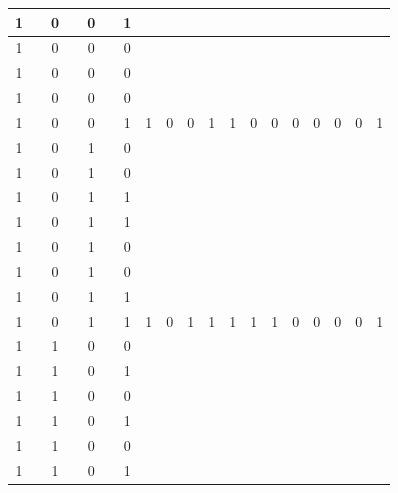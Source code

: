 \begin{table}[!tb]
\begin{tabular}{|c|c|c|c|c|c|c|c|c|c|c|c|c|c|c|c|c|c|c|}
        \rowcolor{yellow!40} 1 &  & 0 &  & 0 &  & 1 &  &  &  &  &  &  &  &  &  &  &  &  \\ \hline
        \rowcolor{yellow!40} 1 &  & 0 &  & 0 &  & 0 &  &  &  &  &  &  &  &  &  &  &  &  \\ \hline
        \rowcolor{yellow!40} 1 &  & 0 &  & 0 &  & 0 &  &  &  &  &  &  &  &  &  &  &  &  \\ \hline
        \rowcolor{yellow!40} 1 &  & 0 &  & 0 &  & 0 &  &  &  &  &  &  &  &  &  &  &  &  \\ \hline
        \rowcolor{yellow!40} 1 &  & 0 &  & 0 &  & 1 & 1 & 0 & 0 & 1 & 1 & 0 & 0 & 0 & 0 & 0 & 0 & 1 \\ \hline
        \rowcolor{gray!40} 1 &  & 0 &  & 1 &  & 0 &  &  &  &  &  &  &  &  &  &  &  &  \\ \hline
        \rowcolor{gray!40} 1 &  & 0 &  & 1 &  & 0 &  &  &  &  &  &  &  &  &  &  &  &  \\ \hline
        \rowcolor{gray!40} 1 &  & 0 &  & 1 &  & 1 &  &  &  &  &  &  &  &  &  &  &  &  \\ \hline
        \rowcolor{gray!40} 1 &  & 0 &  & 1 &  & 1 &  &  &  &  &  &  &  &  &  &  &  &  \\ \hline
        \rowcolor{gray!40} 1 &  & 0 &  & 1 &  & 0 &  &  &  &  &  &  &  &  &  &  &  &  \\ \hline
        \rowcolor{gray!40} 1 &  & 0 &  & 1 &  & 0 &  &  &  &  &  &  &  &  &  &  &  &  \\ \hline
        \rowcolor{gray!40} 1 &  & 0 &  & 1 &  & 1 &  &  &  &  &  &  &  &  &  &  &  &  \\ \hline
        \rowcolor{gray!40} 1 &  & 0 &  & 1 &  & 1 & 1 & 0 & 1 & 1 & 1 & 1 & 1 & 0 & 0 & 0 & 0 & 1 \\ \hline
        \rowcolor{blue!40} 1 &  & 1 &  & 0 &  & 0 &  &  &  &  &  &  &  &  &  &  &  &  \\ \hline
        \rowcolor{blue!40} 1 &  & 1 &  & 0 &  & 1 &  &  &  &  &  &  &  &  &  &  &  &  \\ \hline
        \rowcolor{blue!40} 1 &  & 1 &  & 0 &  & 0 &  &  &  &  &  &  &  &  &  &  &  &  \\ \hline
        \rowcolor{blue!40} 1 &  & 1 &  & 0 &  & 1 &  &  &  &  &  &  &  &  &  &  &  &  \\ \hline
        \rowcolor{blue!40} 1 &  & 1 &  & 0 &  & 0 &  &  &  &  &  &  &  &  &  &  &  &  \\ \hline
        \rowcolor{blue!40} 1 &  & 1 &  & 0 &  & 1 &  &  &  &  &  &  &  &  &  &  &  &  \\ \hline

\end{tabular}
\end{table}

